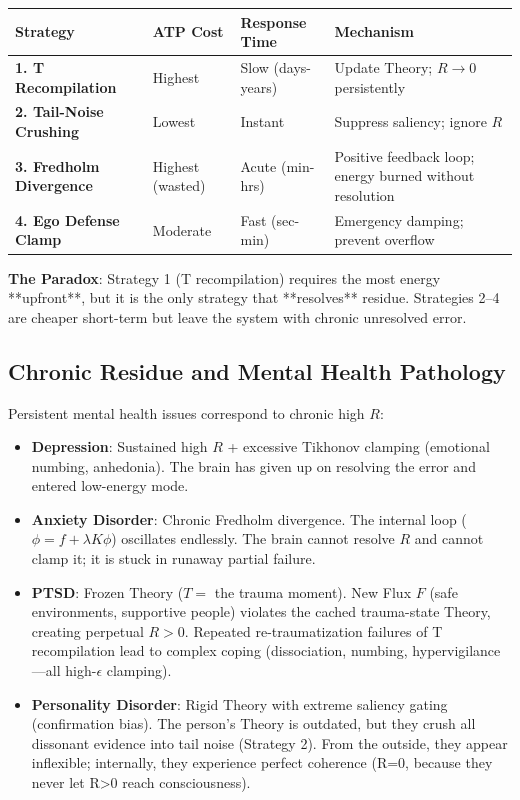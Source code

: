 \documentclass[11pt,oneside]{article}
\theoremstyle{definition}
\begin{document}
\begin{center}
\begin{tabular}{llll}
\toprule
Strategy & ATP Cost & Response Time & Mechanism \\
\midrule
\textbf{1. T Recompilation} & Highest & Slow (days-years) & Update Theory; $R \to 0$ persistently \\
\textbf{2. Tail-Noise Crushing} & Lowest & Instant & Suppress saliency; ignore $R$ \\
\textbf{3. Fredholm Divergence} & Highest (wasted) & Acute (min-hrs) & Positive feedback loop; energy burned without resolution \\
\textbf{4. Ego Defense Clamp} & Moderate & Fast (sec-min) & Emergency damping; prevent overflow \\
\bottomrule
\end{tabular}
\end{center}

\textbf{The Paradox}: Strategy 1 (T recompilation) requires the most energy **upfront**, but it is the only strategy that **resolves** residue. Strategies 2--4 are cheaper short-term but leave the system with chronic unresolved error.

\subsection{Chronic Residue and Mental Health Pathology}

Persistent mental health issues correspond to chronic high $R$:

\begin{itemize}
  \item \textbf{Depression}: Sustained high $R$ + excessive Tikhonov clamping (emotional numbing, anhedonia). The brain has given up on resolving the error and entered low-energy mode.

  \item \textbf{Anxiety Disorder}: Chronic Fredholm divergence. The internal loop ($\phi = f + \lambda K\phi$) oscillates endlessly. The brain cannot resolve $R$ and cannot clamp it; it is stuck in runaway partial failure.

  \item \textbf{PTSD}: Frozen Theory ($T = $ the trauma moment). New Flux $F$ (safe environments, supportive people) violates the cached trauma-state Theory, creating perpetual $R > 0$. Repeated re-traumatization failures of T recompilation lead to complex coping (dissociation, numbing, hypervigilance—all high-$\epsilon$ clamping).

  \item \textbf{Personality Disorder}: Rigid Theory with extreme saliency gating (confirmation bias). The person's Theory is outdated, but they crush all dissonant evidence into tail noise (Strategy 2). From the outside, they appear inflexible; internally, they experience perfect coherence (R=0, because they never let R>0 reach consciousness).
\end{itemize}
\end{document}
